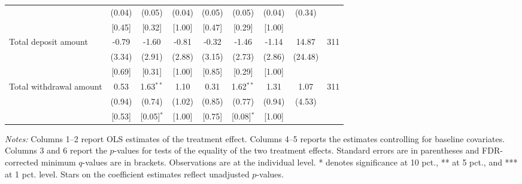 \begin{table}[h]
{\begin{threeparttable}
\begin{tabular}{l*{8}{c}}
          &   (0.04)&   (0.05)&   (0.04)&   (0.05)&   (0.05)&   (0.04)&   (0.34)&         \\
          &   [0.45]&   [0.32]&   [1.00]&   [0.47]&   [0.29]&   [1.00]&         &         \\
Total deposit amount&    -0.79&    -1.60&    -0.81&    -0.32&    -1.46&    -1.14&    14.87&      311\\
          &   (3.34)&   (2.91)&   (2.88)&   (3.15)&   (2.73)&   (2.86)&  (24.48)&         \\
          &   [0.69]&   [0.31]&   [1.00]&   [0.85]&   [0.29]&   [1.00]&         &         \\
Total withdrawal amount&     0.53&1.63$^{**}$&     1.10&     0.31&1.62$^{**}$&     1.31&     1.07&      311\\
          &   (0.94)&   (0.74)&   (1.02)&   (0.85)&   (0.77)&   (0.94)&   (4.53)&         \\
          &   [0.53]&[0.05]$^{*}$&   [1.00]&   [0.75]&[0.08]$^{*}$&   [1.00]&         &         \\
\bottomrule \end{tabular} \begin{tablenotes}[flushleft] \footnotesize \item \emph{Notes:} Columns 1--2 report OLS estimates of the treatment effect. Columns 4--5 reports the estimates controlling for baseline covariates. Columns 3 and 6 report the \(p\)-values for tests of the equality of the two treatment effects. Standard errors are in parentheses and FDR-corrected minimum \(q\)-values are in brackets. Observations are at the individual level. * denotes significance at 10 pct., ** at 5 pct., and *** at 1 pct. level. Stars on the coefficient estimates reflect unadjusted \(p\)-values. \end{tablenotes} \end{threeparttable} } \end{table}

